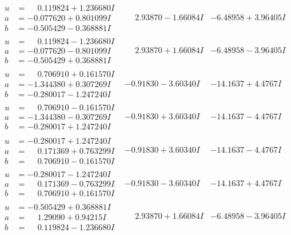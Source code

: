 \documentclass[1p]{elsarticle_modified}
\theoremstyle{definition}
\begin{document}
$$\begin{array}{c|c|c}
\begin{aligned}
u &= \phantom{-}0.119824 + 1.236680 I \\
a &= -0.077620 + 0.801099 I \\
b &= -0.505429 - 0.368881 I\end{aligned}
 & \phantom{-}2.93870 - 1.66084 I & -6.48958 + 3.96405 I \\ \hline\begin{aligned}
u &= \phantom{-}0.119824 - 1.236680 I \\
a &= -0.077620 - 0.801099 I \\
b &= -0.505429 + 0.368881 I\end{aligned}
 & \phantom{-}2.93870 + 1.66084 I & -6.48958 - 3.96405 I \\ \hline\begin{aligned}
u &= \phantom{-}0.706910 + 0.161570 I \\
a &= -1.344380 + 0.307269 I \\
b &= -0.280017 - 1.247240 I\end{aligned}
 & -0.91830 - 3.60340 I & -14.1637 + 4.4767 I \\ \hline\begin{aligned}
u &= \phantom{-}0.706910 - 0.161570 I \\
a &= -1.344380 - 0.307269 I \\
b &= -0.280017 + 1.247240 I\end{aligned}
 & -0.91830 + 3.60340 I & -14.1637 - 4.4767 I \\ \hline\begin{aligned}
u &= -0.280017 + 1.247240 I \\
a &= \phantom{-}0.171369 + 0.763299 I \\
b &= \phantom{-}0.706910 - 0.161570 I\end{aligned}
 & -0.91830 + 3.60340 I & -14.1637 - 4.4767 I \\ \hline\begin{aligned}
u &= -0.280017 - 1.247240 I \\
a &= \phantom{-}0.171369 - 0.763299 I \\
b &= \phantom{-}0.706910 + 0.161570 I\end{aligned}
 & -0.91830 - 3.60340 I & -14.1637 + 4.4767 I \\ \hline\begin{aligned}
u &= -0.505429 + 0.368881 I \\
a &= \phantom{-}1.29090 + 0.94215 I \\
b &= \phantom{-}0.119824 - 1.236680 I\end{aligned}
 & \phantom{-}2.93870 + 1.66084 I & -6.48958 - 3.96405 I \\ \hline\begin{aligned}

\end{aligned}
\end{array}$$
\end{document}
